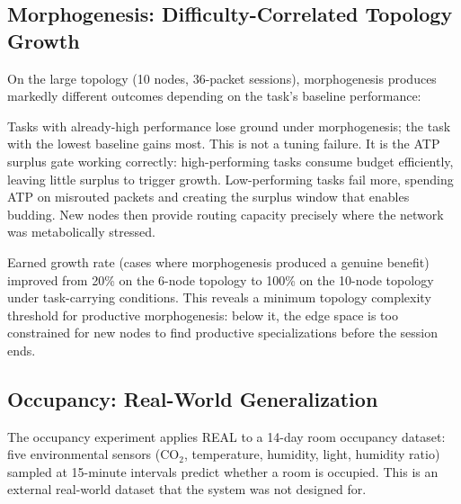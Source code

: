 \documentclass[letterpaper]{article}
\begin{document}
\subsection{Morphogenesis: Difficulty-Correlated Topology Growth}

On the large topology (10 nodes, 36-packet sessions), morphogenesis produces markedly different outcomes depending on the task's baseline performance:

\begin{table}[ht]
    \centering
    \caption{Morphogenesis performance across tasks.}
    \label{tab:morpho}
\end{table}

Tasks with already-high performance lose ground under morphogenesis; the task with the lowest baseline gains most. This is not a tuning failure. It is the ATP surplus gate working correctly: high-performing tasks consume budget efficiently, leaving little surplus to trigger growth. Low-performing tasks fail more, spending ATP on misrouted packets and creating the surplus window that enables budding. New nodes then provide routing capacity precisely where the network was metabolically stressed.

Earned growth rate (cases where morphogenesis produced a genuine benefit) improved from 20\% on the 6-node topology to 100\% on the 10-node topology under task-carrying conditions. This reveals a minimum topology complexity threshold for productive morphogenesis: below it, the edge space is too constrained for new nodes to find productive specializations before the session ends.

\subsection{Occupancy: Real-World Generalization}

The occupancy experiment applies REAL to a 14-day room occupancy dataset: five environmental sensors (CO$_2$, temperature, humidity, light, humidity ratio) sampled at 15-minute intervals predict whether a room is occupied. This is an external real-world dataset that the system was not designed for.
\end{document}
